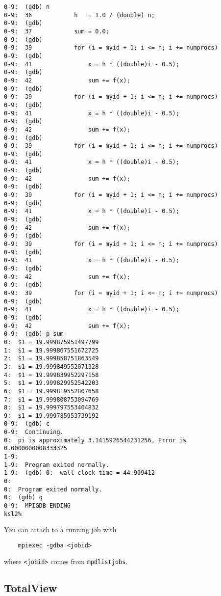 \documentclass[dvipdfm,11pt]{article}
\begin{document}
\begin{small}
\begin{verbatim}
0-9:  (gdb) n
0-9:  36            h   = 1.0 / (double) n;
0-9:  (gdb) 
0-9:  37            sum = 0.0;
0-9:  (gdb) 
0-9:  39            for (i = myid + 1; i <= n; i += numprocs)
0-9:  (gdb) 
0-9:  41                x = h * ((double)i - 0.5);
0-9:  (gdb) 
0-9:  42                sum += f(x);
0-9:  (gdb) 
0-9:  39            for (i = myid + 1; i <= n; i += numprocs)
0-9:  (gdb) 
0-9:  41                x = h * ((double)i - 0.5);
0-9:  (gdb) 
0-9:  42                sum += f(x);
0-9:  (gdb) 
0-9:  39            for (i = myid + 1; i <= n; i += numprocs)
0-9:  (gdb) 
0-9:  41                x = h * ((double)i - 0.5);
0-9:  (gdb) 
0-9:  42                sum += f(x);
0-9:  (gdb) 
0-9:  39            for (i = myid + 1; i <= n; i += numprocs)
0-9:  (gdb) 
0-9:  41                x = h * ((double)i - 0.5);
0-9:  (gdb) 
0-9:  42                sum += f(x);
0-9:  (gdb) 
0-9:  39            for (i = myid + 1; i <= n; i += numprocs)
0-9:  (gdb) 
0-9:  41                x = h * ((double)i - 0.5);
0-9:  (gdb) 
0-9:  42                sum += f(x);
0-9:  (gdb) 
0-9:  39            for (i = myid + 1; i <= n; i += numprocs)
0-9:  (gdb) 
0-9:  41                x = h * ((double)i - 0.5);
0-9:  (gdb) 
0-9:  42                sum += f(x);
0-9:  (gdb) p sum
0:  $1 = 19.999875951497799
1:  $1 = 19.999867551672725
2:  $1 = 19.999858751863549
3:  $1 = 19.999849552071328
4:  $1 = 19.999839952297158
5:  $1 = 19.999829952542203
6:  $1 = 19.999819552807658
7:  $1 = 19.999808753094769
8:  $1 = 19.999797553404832
9:  $1 = 19.999785953739192
0-9:  (gdb) c
0-9:  Continuing.
0:  pi is approximately 3.1415926544231256, Error is 0.0000000008333325
1-9:  
1-9:  Program exited normally.
1-9:  (gdb) 0:  wall clock time = 44.909412
0:  
0:  Program exited normally.
0:  (gdb) q
0-9:  MPIGDB ENDING
ksl2% 
\end{verbatim}
\end{small}
You can attach to a running job with
\begin{verbatim}
    mpiexec -gdba <jobid>
\end{verbatim}
where \texttt{<jobid>} comes from \texttt{mpdlistjobs}.


\subsection{TotalView}
\label{sec:totalview}
\end{document}
